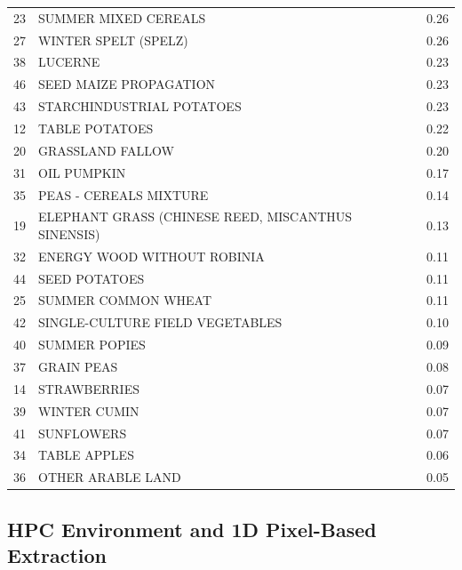 \begin{table}[htbp]
{\begin{tabular}{clr}
            23 & SUMMER MIXED CEREALS & 0.26 \\
            27 & WINTER SPELT (SPELZ) & 0.26 \\
            38 & LUCERNE & 0.23 \\
            46 & SEED MAIZE PROPAGATION & 0.23 \\
            43 & STARCHINDUSTRIAL POTATOES & 0.23 \\
            12 & TABLE POTATOES & 0.22 \\
            20 & GRASSLAND FALLOW & 0.20 \\
            31 & OIL PUMPKIN & 0.17 \\
            35 & PEAS - CEREALS MIXTURE & 0.14 \\
            19 & ELEPHANT GRASS (CHINESE REED, MISCANTHUS SINENSIS) & 0.13 \\
            32 & ENERGY WOOD WITHOUT ROBINIA & 0.11 \\
            44 & SEED POTATOES & 0.11 \\
            25 & SUMMER COMMON WHEAT & 0.11 \\
            42 & SINGLE-CULTURE FIELD VEGETABLES & 0.10 \\
            40 & SUMMER POPIES & 0.09 \\
            37 & GRAIN PEAS & 0.08 \\
            14 & STRAWBERRIES & 0.07 \\
            39 & WINTER CUMIN & 0.07 \\
            41 & SUNFLOWERS & 0.07 \\
            34 & TABLE APPLES & 0.06 \\
            36 & OTHER ARABLE LAND & 0.05 \\
            \bottomrule
        \end{tabular}
    }
\end{table}


\subsection{HPC Environment and 1D Pixel-Based Extraction}
\label{subsec:hpc_environment}

